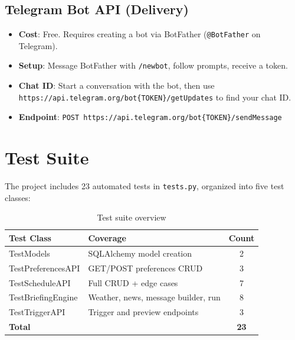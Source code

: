 \documentclass[12pt, a4paper]{article}
\begin{document}
\subsection{Telegram Bot API (Delivery)}

\begin{itemize}[leftmargin=2em]
  \item \textbf{Cost}: Free. Requires creating a bot via BotFather (\texttt{@BotFather} on Telegram).
  \item \textbf{Setup}: Message BotFather with \texttt{/newbot}, follow prompts, receive a token.
  \item \textbf{Chat ID}: Start a conversation with the bot, then use \texttt{https://api.telegram.org/bot\{TOKEN\}/getUpdates} to find your chat ID.
  \item \textbf{Endpoint}: \texttt{POST https://api.telegram.org/bot\{TOKEN\}/sendMessage}
\end{itemize}

\section{Test Suite}

The project includes 23 automated tests in \texttt{tests.py}, organized into five test classes:

\begin{table}[h!]
\centering
\begin{tabular}{@{}llc@{}}
\toprule
\textbf{Test Class} & \textbf{Coverage} & \textbf{Count} \\
\midrule
TestModels             & SQLAlchemy model creation            & 2 \\
TestPreferencesAPI     & GET/POST preferences CRUD            & 3 \\
TestScheduleAPI        & Full CRUD + edge cases               & 7 \\
TestBriefingEngine     & Weather, news, message builder, run  & 8 \\
TestTriggerAPI         & Trigger and preview endpoints         & 3 \\
\midrule
\textbf{Total}         &                                      & \textbf{23} \\
\bottomrule
\end{tabular}
\caption{Test suite overview}
\end{table}
\end{document}
